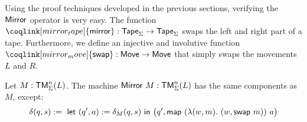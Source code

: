 %
Using the proof techniques developed in the previous sections, verifying the $\mathsf{Mirror}$ operator is very easy.  The function
$\coqlink[mirror_tape]{\MS{mirror}} : \Tape_\Sigma \to \Tape_\Sigma$ swaps the left and right part of a tape.  %
Furthermore, we define an injective and involutive function $\coqlink[mirror_move]{\MS{swap}}:\MS{Move} \to \MS{Move}$ that simply swaps the movements
$L$ and $R$.  %
\begin{definition}[$\MS{Mirror}~M$][Mirror]
  \label{def:Mirror}
  Let $M:\mathsf{TM}_\Sigma^n(L)$.  The machine $\mathsf{Mirror}~M : \mathsf{TM}_\Sigma^n(L)$ has the same components as $M$, except:
  \[
    \delta(q, s) :=~ \mathsf{let}~(q', a) := \delta_M(q,s)~\mathsf{in}~\bigl(q', \mathsf{map}~(\lambda(w, m).~(w, \mathsf{swap}~m))~a \bigr)
  \]
\end{definition}


